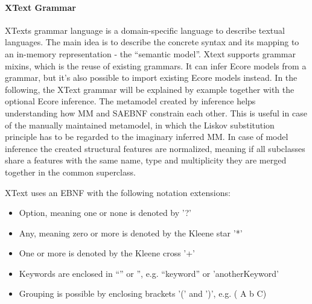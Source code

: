 \paragraph{XText Grammar}
XTexts grammar language is a domain-specific language to describe textual languages. The main idea is to describe the concrete syntax and its mapping to an in-memory representation - the ``semantic model''. Xtext supports grammar mixins, which is the reuse of existing grammars. It can infer Ecore models from a grammar, but it's also possible to import existing Ecore models instead. In the following, the XText grammar will be explained by example together with the optional Ecore  inference. The metamodel created by inference helps understanding how MM and SAEBNF constrain each other. This is useful in case of the manually maintained metamodel, in which the Liskov substitution principle has to be regarded to the imaginary inferred MM. In case of model inference the created structural features are normalized, meaning if all subclasses share a features with the same name, type and multiplicity they are merged together in the common superclass.

XText uses an EBNF with the following notation extensions:
\begin{itemize}
	\item Option, meaning one or none is denoted by '?'
	\item Any, meaning zero or more is denoted by the Kleene star '*'
	\item One or more is denoted by the Kleene cross '+'
	\item Keywords are enclosed in ``'' or '', e.g. ``keyword'' or 'anotherKeyword'
	\item Grouping is possible by enclosing brackets '(' and  ')', e.g.  ( A b C)
\end{itemize}

